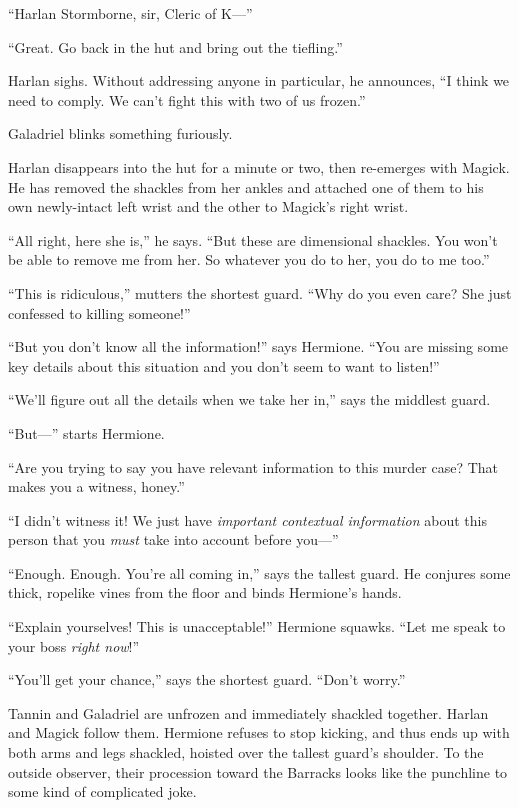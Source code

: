 \documentclass[smalldemyvopaper,11pt,twoside,onecolumn,openright,extrafontsizes]{memoir}
\begin{document}
``Harlan Stormborne, sir, Cleric of K---''

``Great. Go back in the hut and bring out the tiefling.''

Harlan sighs. Without addressing anyone in particular, he announces, ``I
think we need to comply. We can't fight this with two of us frozen.''

Galadriel blinks something furiously.

Harlan disappears into the hut for a minute or two, then re-emerges with
Magick. He has removed the shackles from her ankles and attached one of
them to his own newly-intact left wrist and the other to Magick's right
wrist.

``All right, here she is,'' he says. ``But these are dimensional
shackles. You won't be able to remove me from her. So whatever you do to
her, you do to me too.''

``This is ridiculous,'' mutters the shortest guard. ``Why do you even
care? She just confessed to killing someone!''

``But you don't know all the information!'' says Hermione. ``You are
missing some key details about this situation and you don't seem to want
to listen!''

``We'll figure out all the details when we take her in,'' says the
middlest guard.

``But---'' starts Hermione.

``Are you trying to say you have relevant information to this murder
case? That makes you a witness, honey.''

``I didn't witness it! We just have \emph{important contextual
information} about this person that you \emph{must} take into account
before you---''

``Enough. Enough. You're all coming in,'' says the tallest guard. He
conjures some thick, ropelike vines from the floor and binds Hermione's
hands.

``Explain yourselves! This is unacceptable!'' Hermione squawks. ``Let me
speak to your boss \emph{right now}!''

``You'll get your chance,'' says the shortest guard. ``Don't worry.''

Tannin and Galadriel are unfrozen and immediately shackled together.
Harlan and Magick follow them. Hermione refuses to stop kicking, and
thus ends up with both arms and legs shackled, hoisted over the tallest
guard's shoulder. To the outside observer, their procession toward the
Barracks looks like the punchline to some kind of complicated joke.
\end{document}

